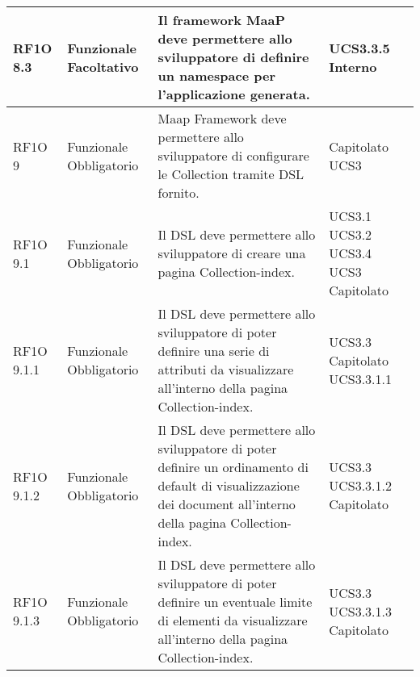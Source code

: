 \begin{center}
\begin{longtable}{ | l | p{2cm} | p{5cm} | p{1.7cm} |}
        RF1O 8.3 & Funzionale \newline  Facoltativo  & Il framework MaaP deve permettere allo sviluppatore di definire un namespace per l'applicazione generata. &  UCS3.3.5 \newline  Interno \newline  \\ \hline      
        RF1O 9  & Funzionale \newline  Obbligatorio  & Maap Framework deve permettere allo sviluppatore di configurare le Collection tramite DSL fornito.
 &  Capitolato \newline  UCS3 \newline  \\ \hline      
        RF1O 9.1  & Funzionale \newline  Obbligatorio  & Il DSL deve permettere allo sviluppatore di creare una pagina Collection-index.
 &  UCS3.1 \newline  UCS3.2 \newline  UCS3.4 \newline  UCS3 \newline  Capitolato \newline  \\ \hline      
        RF1O 9.1.1  & Funzionale \newline  Obbligatorio  & Il DSL deve permettere allo sviluppatore di poter definire una serie di attributi da visualizzare all'interno della pagina Collection-index.
 &  UCS3.3 \newline  Capitolato \newline  UCS3.3.1.1 \newline  \\ \hline      
        RF1O 9.1.2  & Funzionale \newline  Obbligatorio  & Il DSL deve permettere allo sviluppatore di poter definire un ordinamento di default di visualizzazione dei document all'interno della pagina Collection-index. &  UCS3.3 \newline  UCS3.3.1.2 \newline  Capitolato \newline  \\ \hline      
        RF1O 9.1.3  & Funzionale \newline  Obbligatorio  & Il DSL deve permettere allo sviluppatore di poter definire un eventuale limite di elementi da visualizzare all'interno della pagina Collection-index.
 &  UCS3.3 \newline  UCS3.3.1.3 \newline  Capitolato \newline  \\ \hline      

\end{longtable}
\end{center}
